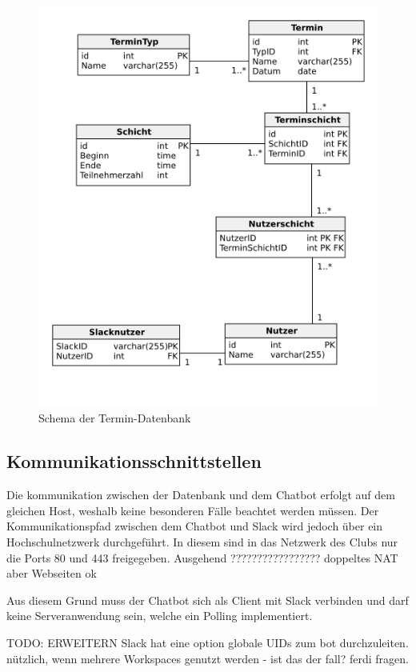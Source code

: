 \begin{figure}[htbp]
    \includegraphics[width=\textwidth]{../docs/uml/Steckerbot-DB.png}
    \caption{Schema der Termin-Datenbank}
    \label{img:db-schema}
\end{figure}


\subsection{Kommunikationsschnittstellen}

Die kommunikation zwischen der Datenbank und dem Chatbot erfolgt auf dem gleichen Host, weshalb keine besonderen Fälle beachtet werden müssen. Der Kommunikationspfad zwischen dem Chatbot und Slack wird jedoch über ein Hochschulnetzwerk durchgeführt. In diesem sind in das Netzwerk des Clubs nur die Ports 80 und 443 freigegeben. Ausgehend ????????????????? doppeltes NAT aber Webseiten ok

Aus diesem Grund muss der Chatbot sich als Client mit Slack verbinden und darf keine Serveranwendung sein, welche ein Polling implementiert.



TODO: ERWEITERN
Slack hat eine option globale UIDs zum bot durchzuleiten. nützlich, wenn mehrere Workspaces genutzt werden - ist das der fall? ferdi fragen.
